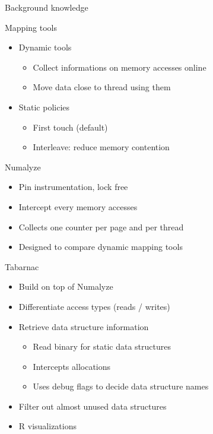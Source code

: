 \documentclass[xcolor={usenames,dvipsnames},hyperref={pdfusetitle}]{beamer}
\begin{document}
\begin{frame}{Background knowledge}
    \begin{block}{Mapping tools}
        \begin{itemize}
            \item Dynamic tools~\cite{Corbet12Toward,Diener14kMAF}
                \begin{itemize}
                    \item Collect informations on memory accesses online
                    \item Move data close to thread using them
                \end{itemize}
            \item  Static policies
                \begin{itemize}
                    \item First touch (default)
                    \item Interleave: reduce memory contention
                \end{itemize}
        \end{itemize}
    \end{block}
    \pause
    \begin{alertblock}{Numalyze~\cite{Diener15Characterizing}}
        \begin{itemize}
            \item Pin instrumentation, lock free
            \item Intercept every memory accesses
            \item Collects one counter per page and per thread
            \item Designed to compare dynamic mapping tools
        \end{itemize}
    \end{alertblock}
\end{frame}

\begin{frame}{Tabarnac}
    \begin{alertblock}{}
        \begin{itemize}
            \item Build on top of Numalyze
            \item Differentiate access types (reads / writes)
            \item Retrieve data structure information
                \begin{itemize}
                    \item Read binary for static data structures
                    \item Intercepts allocations
                    \item Uses debug flags to decide data structure names
                \end{itemize}
            \item Filter out almost unused data structures
            \item R visualizations
        \end{itemize}
    \end{alertblock}
\end{frame}
\end{document}

